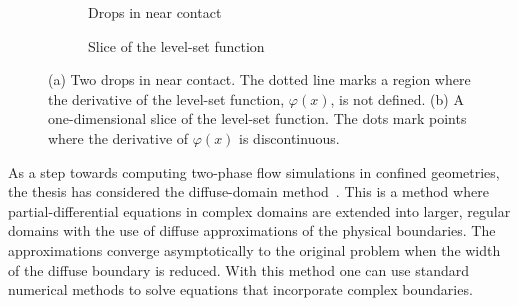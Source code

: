 \documentclass[11pt,b5paper,DIV=calc,BCOR1.3cm,headings=small,%
               footinclude=false,headsepline]{scrbook}
\begin{document}
\begin{figure}[tbp]
 \centering
 \begin{subfigure}[t]{0.47\textwidth}
   \centering
   \caption{Drops in near contact}
 \end{subfigure}
 \begin{subfigure}[t]{0.47\textwidth}
   \centering
   \caption{Slice of the level-set function}
 \end{subfigure}
 \caption{(a) Two drops in near contact.  The dotted line marks a region
   where the derivative of the level-set function, $\varphi(x)$, is not
   defined.  (b) A one-dimensional slice of the level-set function.  The dots
   mark points where the derivative of $\varphi(x)$ is discontinuous.}
 \label{fig:curvature-problem}
\end{figure}

As a step towards computing two-phase flow simulations in confined geometries,
the thesis has considered the diffuse-domain method~\cite{Li09}.  This is
a method where partial-differential equations in complex domains are extended
into larger, regular domains with the use of diffuse approximations of the
physical boundaries.  The approximations converge asymptotically to the
original problem when the width of the diffuse boundary is reduced.  With this
method one can use standard numerical methods to solve equations that
incorporate complex boundaries.
\end{document}
